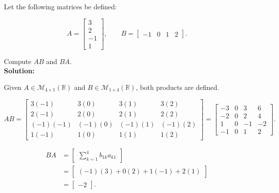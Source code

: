\item Let the following matrices be defined:

$$
A = \begin{bmatrix}
    3 \\
    2 \\
    -1 \\
    1
\end{bmatrix},
\qquad
B = \begin{bmatrix}
    -1 & 0 & 1 & 2
\end{bmatrix}.
$$

Compute $AB$ and $BA$.\\[0.5em]

\textbf{Solution:}

\begin{answer}
    Given $A \in \mathcal{M}_{4\times1}(\mathbb{R})$
    and $B \in \mathcal{M}_{1\times4}(\mathbb{R})$,
    both products are defined.

    $$
    AB =
    \begin{bmatrix}
        3(-1) & 3(0) & 3(1) & 3(2) \\
        2(-1) & 2(0) & 2(1) & 2(2) \\
        (-1)(-1) & (-1)(0) & (-1)(1) & (-1)(2) \\
        1(-1) & 1(0) & 1(1) & 1(2)
    \end{bmatrix}
    =
    \begin{bmatrix}
        -3 & 0 & 3 & 6 \\
        -2 & 0 & 2 & 4 \\
        1 & 0 & -1 & -2 \\
        -1 & 0 & 1 & 2
    \end{bmatrix}.
    $$

    $$
    \begin{aligned}
    BA
        &= \begin{bmatrix}
            \displaystyle\sum_{k=1}^{4}b_{1k}a_{k1}
        \end{bmatrix} \\[1em]
        &= \begin{bmatrix}
            (-1)(3)+0(2)+1(-1)+2(1)
        \end{bmatrix} \\[1em]
        &= \boxed{\begin{bmatrix}-2\end{bmatrix}}.
    \end{aligned}
    $$
\end{answer}
